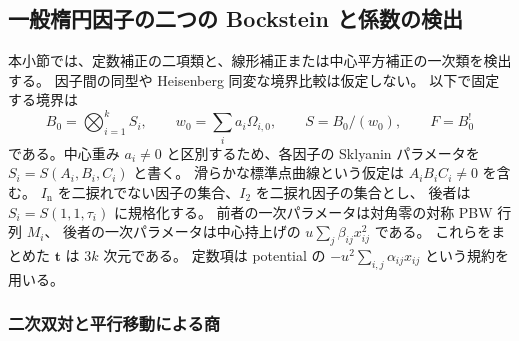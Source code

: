 \subsection{一般楕円因子の二つの Bockstein と係数の検出}
\label{ebc:subsec:bockstein}

本小節では、定数補正の二項類と、線形補正または中心平方補正の一次類を検出する。
因子間の同型や Heisenberg 同変な境界比較は仮定しない。
以下で固定する境界は
\[
 B_0=\bigotimes_{i=1}^kS_i,\qquad
 w_0=\sum_i a_i\Omega_{i,0},\qquad
 S=B_0/(w_0),\qquad F=B_0^!
\]
である。中心重み $a_i\ne0$ と区別するため、各因子の Sklyanin パラメータを
$S_i=S(A_i,B_i,C_i)$ と書く。
滑らかな標準点曲線という仮定は $A_iB_iC_i\ne0$ を含む。
$I_{\mathrm{n}}$ を二捩れでない因子の集合、$I_2$ を二捩れ因子の集合とし、
後者は $S_i=S(1,1,\tau_i)$ に規格化する。
前者の一次パラメータは対角零の対称 PBW 行列 $M_i$、
後者の一次パラメータは中心持上げの
$u\sum_j\beta_{ij}x_{ij}^2$ である。
これらをまとめた $\mathbf t$ は $3k$ 次元である。
定数項は potential の $-u^2\sum_{i,j}\alpha_{ij}x_{ij}$ という規約を用いる。

\subsubsection{二次双対と平行移動による商}

